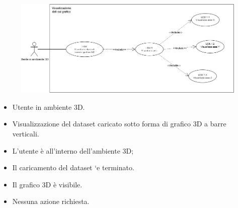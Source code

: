 \begin{figure}[h!]
    \centering
    \includegraphics[scale=0.45]{template/images/UC6.png}
    \caption{}
\end{figure}
\UCdsc
    { %
        \begin{itemize}
            \item Utente in ambiente 3D.
        \end{itemize}
    }
    { %
        \begin{itemize}
            \item Visualizzazione del dataset caricato sotto forma di grafico 3D a barre verticali.
        \end{itemize}
    }
    { %
        \begin{itemize}
            \item L'utente è all'interno dell'ambiente 3D;
            \item Il caricamento del dataset `e terminato.
        \end{itemize}
    }
    { %
        \begin{itemize}
            \item Il grafico 3D è visibile.
        \end{itemize}
    }
    { %
        \begin{itemize}
            \item Nessuna azione richiesta.
        \end{itemize}
    }




